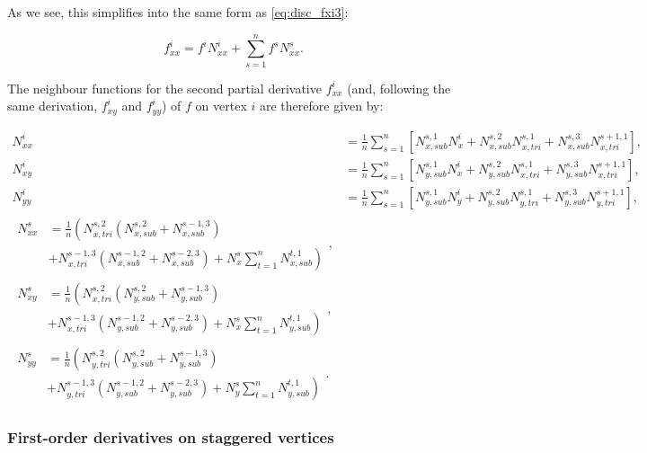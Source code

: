 \documentclass{article}
\begin{document}
As we see, this simplifies into the same form as \eqref{eq:disc_fxi3}:

\begin{equation} \label{eq:disc_fxxi3}
f_{xx}^i = f^i N_{xx}^i + \sum_{s=1}^n f^s N_{xx}^s.
\end{equation}

The neighbour functions for the second partial derivative $f_{xx}^i$ (and, following the same derivation, $f_{xy}^i$ and $f_{yy}^i$) of $f$ on vertex $i$ are therefore given by:

\begin{align} \label{eq:disc_Nxxi2}
N_{xx}^i &= \frac{1}{n} \sum_{s=1}^n \left[ N_{x,sub}^{s,1} N_x^i + N_{x,sub}^{s,2} N_{x,tri}^{s,1} + N_{x,sub}^{s,3} N_{x,tri}^{s+1,1} \right], \\
N_{xy}^i &= \frac{1}{n} \sum_{s=1}^n \left[ N_{y,sub}^{s,1} N_x^i + N_{y,sub}^{s,2} N_{x,tri}^{s,1} + N_{y,sub}^{s,3} N_{x,tri}^{s+1,1} \right], \\
N_{yy}^i &= \frac{1}{n} \sum_{s=1}^n \left[ N_{y,sub}^{s,1} N_y^i + N_{y,sub}^{s,2} N_{y,tri}^{s,1} + N_{y,sub}^{s,3} N_{y,tri}^{s+1,1} \right], \\
\begin{split} N_{xx}^s &= \frac{1}{n} \left( N_{x,tri}^{s,2} \left( N_{x,sub}^{s,2} + N_{x,sub}^{s-1,3} \right) \right. \\
 & \left. + N_{x,tri}^{s-1,3} \left( N_{x,sub}^{s-1,2} + N_{x,sub}^{s-2,3} \right) + N_x^s \sum_{t=1}^n N_{x,sub}^{t,1} \right) \end{split}, \\
\begin{split} N_{xy}^s &= \frac{1}{n} \left( N_{x,tri}^{s,2} \left( N_{y,sub}^{s,2} + N_{y,sub}^{s-1,3} \right) \right. \\
 & \left. + N_{x,tri}^{s-1,3} \left( N_{y,sub}^{s-1,2} + N_{y,sub}^{s-2,3} \right) + N_x^s \sum_{t=1}^n N_{y,sub}^{t,1} \right) \end{split}, \\
\begin{split} N_{yy}^s &= \frac{1}{n} \left( N_{y,tri}^{s,2} \left( N_{y,sub}^{s,2} + N_{y,sub}^{s-1,3} \right) \right. \\
 & \left. + N_{y,tri}^{s-1,3} \left( N_{y,sub}^{s-1,2} + N_{y,sub}^{s-2,3} \right) + N_y^s \sum_{t=1}^n N_{y,sub}^{t,1} \right) \end{split}.
\end{align}

\subsubsection{First-order derivatives on staggered vertices}
\end{document}
